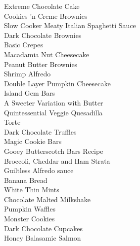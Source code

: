 \documentclass[11pt, twoside, openany]{book}
\begin{document}
Extreme Chocolate Cake\hrulefill\pageref{extreme-chocolate-cake}\\
Cookies 'n Creme Brownies\hrulefill\pageref{cookies-'n-creme-brownies}\\
Slow Cooker Meaty Italian Spaghetti Sauce\hrulefill\pageref{slow-cooker-meaty-italian-spaghetti-sauce}\\
Dark Chocolate Brownies\hrulefill\pageref{dark-chocolate-brownies}\\
Basic Crepes\hrulefill\pageref{basic-crepes}\\
Macadamia Nut Cheesecake\hrulefill\pageref{macadamia-nut-cheesecake}\\
Peanut Butter Brownies\hrulefill\pageref{peanut-butter-brownies}\\
Shrimp Alfredo\hrulefill\pageref{shrimp-alfredo}\\
Double Layer Pumpkin Cheesecake\hrulefill\pageref{double-layer-pumpkin-cheesecake}\\
Island Gem Bars\hrulefill\pageref{island-gem-bars}\\
A Sweeter Variation with Butter\hrulefill\pageref{a-sweeter-variation-with-butter}\\
Quintessential Veggie Quesadilla\hrulefill\pageref{quintessential-veggie-quesadilla}\\
Torte\hrulefill\pageref{torte}\\
Dark Chocolate Truffles\hrulefill\pageref{dark-chocolate-truffles}\\
Magic Cookie Bars\hrulefill\pageref{magic-cookie-bars}\\
Gooey Butterscotch Bars Recipe\hrulefill\pageref{gooey-butterscotch-bars-recipe}\\
Broccoli, Cheddar and Ham Strata\hrulefill\pageref{broccoli,-cheddar-and-ham-strata}\\
Guiltless Alfredo sauce\hrulefill\pageref{guiltless-alfredo-sauce}\\
Banana Bread\hrulefill\pageref{banana-bread}\\
White Thin Mints\hrulefill\pageref{white-thin-mints}\\
Chocolate Malted Milkshake\hrulefill\pageref{chocolate-malted-milkshake}\\
Pumpkin Waffles\hrulefill\pageref{pumpkin-waffles}\\
Monster Cookies\hrulefill\pageref{monster-cookies}\\
Dark Chocolate Cupcakes\hrulefill\pageref{dark-chocolate-cupcakes}\\
Honey Balasamic Salmon\hrulefill\pageref{honey-balasamic-salmon}\\
\end{document}
